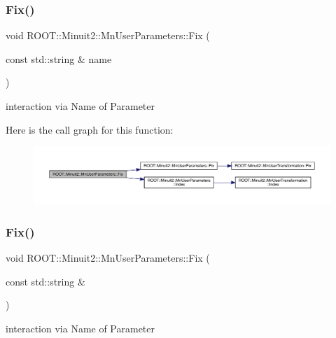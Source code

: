 \subsubsection{\texorpdfstring{Fix()}{Fix()}\hspace{0.1cm}{\footnotesize\ttfamily [4/6]}}
{\footnotesize\ttfamily void R\+O\+O\+T\+::\+Minuit2\+::\+Mn\+User\+Parameters\+::\+Fix (\begin{DoxyParamCaption}\item[{const std\+::string \&}]{name }\end{DoxyParamCaption})}



interaction via Name of Parameter 

Here is the call graph for this function\+:
\nopagebreak
\begin{figure}[H]
\begin{center}
\leavevmode
\includegraphics[width=350pt]{d6/d10/classROOT_1_1Minuit2_1_1MnUserParameters_a2ae09cd0fae9785d4c097439862ab63b_cgraph}
\end{center}
\end{figure}
\mbox{\label{classROOT_1_1Minuit2_1_1MnUserParameters_a2ae09cd0fae9785d4c097439862ab63b}} 
\subsubsection{\texorpdfstring{Fix()}{Fix()}\hspace{0.1cm}{\footnotesize\ttfamily [5/6]}}
{\footnotesize\ttfamily void R\+O\+O\+T\+::\+Minuit2\+::\+Mn\+User\+Parameters\+::\+Fix (\begin{DoxyParamCaption}\item[{const std\+::string \&}]{ }\end{DoxyParamCaption})}



interaction via Name of Parameter 

\mbox{\label{classROOT_1_1Minuit2_1_1MnUserParameters_a2ae09cd0fae9785d4c097439862ab63b}} 
